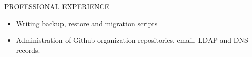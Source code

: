 \documentclass{resume} %
\begin{document}
\begin{rSection}{PROFESSIONAL EXPERIENCE}
\begin{rSubsection}
\begin{itemize}
    \item Writing backup, restore and migration scripts

    \item Administration of Github organization repositories,
      email, LDAP and DNS records.

    \end{itemize}






    

    

    

\end{rSubsection}
\end{rSection}
\end{document}
